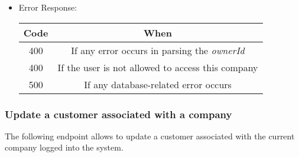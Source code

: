 \begin{itemize}
    \item Error Response:
    \begin{table}[!h]
    \centering 
    \begin{tabular}{|c|c|}
    \hline
    \multicolumn{1}{|c|}{\textbf{Code}} & \multicolumn{1}{c|}{\textbf{When}} \\ \hline
    400 & If any error occurs in parsing the \textit{ownerId}  \\\hline
    400 & If the user is not allowed to access this company \\\hline
    500 & If any database-related error occurs \\\hline
    \end{tabular} 
    \end{table} 
    
\end{itemize}


\newpage
\subsubsection*{Update a customer associated with a company}

The following endpoint allows to update a customer associated with the current company logged into the system.

